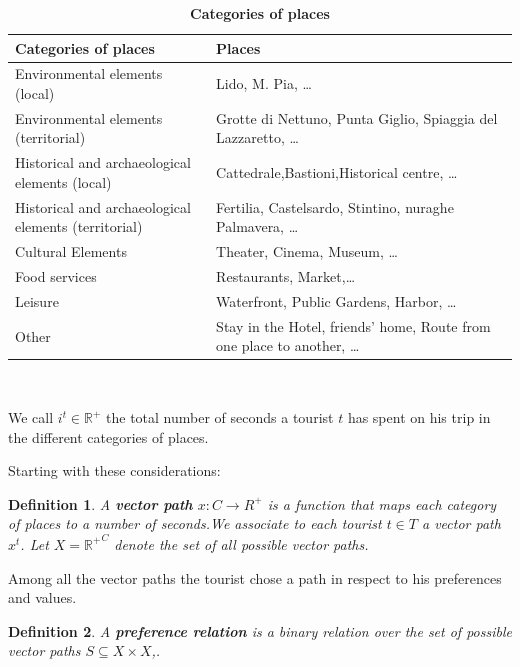 \documentclass[a4paper]{article}
\begin{document}
\begin{table}[h]
\begin{tabular}{ll}
\hline
\textbf{Categories of places}&\textbf{Places}\\
\hline
\parbox{5cm}{Environmental elements (local)}&\parbox{6cm}{Lido, M. Pia, \dots}\\
\parbox{5cm}{Environmental elements (territorial)}&\parbox{6cm}{Grotte di Nettuno, Punta Giglio, Spiaggia del Lazzaretto, \dots}\\
\parbox{5cm}{Historical and archaeological elements (local)}&\parbox{6cm}{Cattedrale,Bastioni,Historical centre, \dots}\\
\parbox{5cm}{Historical and archaeological elements (territorial)}&\parbox{6cm}{Fertilia, Castelsardo, Stintino, nuraghe Palmavera, \dots}\\
\parbox{5cm}{Cultural Elements}&\parbox{6cm}{Theater, Cinema, Museum, \dots}\\
\parbox{5cm}{Food services}&\parbox{6cm}{Restaurants, Market,\dots}\\
\parbox{5cm}{Leisure}&\parbox{6cm}{Waterfront, Public Gardens, Harbor, \dots}\\
\parbox{5cm}{Other}&\parbox{6cm}{Stay in the Hotel, friends' home, Route from one place to another, \dots}\\
\hline
\end{tabular}

\caption{\textbf{Categories of places}}\
\label{Table1}
\end{table}

We call $i^t \in {\mathbb{R}^+}$ the total number of seconds a tourist $t$ has spent on his trip in the different categories of places.

Starting with these considerations:


\newtheorem{mydef}{Definition}
\begin{mydef}
A \textbf{vector path} $x: C \rightarrow R^+$ is a function that maps each category of places to a number of seconds.We associate to each tourist $t \in T $ a vector path $x^t$. Let $X={\mathbb{R}^+}^C$ denote the set of all possible vector paths.
\end{mydef}

Among all the vector paths the tourist chose a path in respect to his preferences and values.

\begin{mydef}
A \textbf{preference relation} is a binary relation over the set of possible vector paths $S \subseteq X \times X $,.
\end{mydef}
\end{document}
